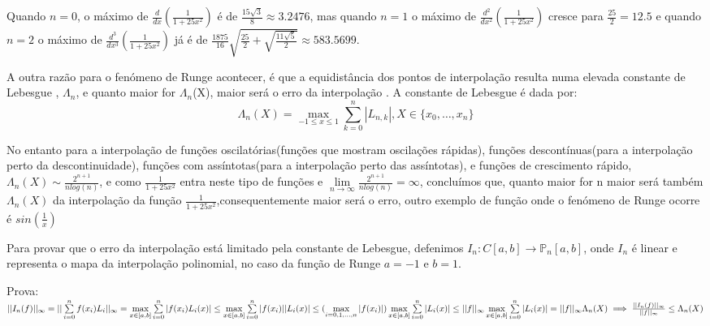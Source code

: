 \documentclass[12pt]{article}
\begin{document}
\hspace{0.5cm}Quando $n=0$, o máximo de $\frac{d}{dx}(\frac{1}{1+25x^2})$ é de $\frac{15\sqrt{3}}{8} \approx 3.2476$, mas quando $n=1$ o máximo de $\frac{d^2}{dx^2}(\frac{1}{1+25x^2})$ cresce para $\frac{25}{2}=12.5$ e quando $n=2$ o máximo de $\frac{d^3}{dx^3}(\frac{1}{1+25x^2})$ já é de $\frac{1875}{16}\sqrt{\frac{25}{2}+\sqrt{\frac{11\sqrt{5}}{2}}} \approx 583.5699$.



\hspace{0.5cm}A outra razão para o fenómeno de Runge acontecer, é que a equidistância dos pontos de interpolação resulta numa elevada constante de Lebesgue \cite{wikipedia3}, $\Lambda_n$, e quanto maior for $\Lambda_n$(X), maior será o erro da interpolação . A constante de Lebesgue é dada por: \[\Lambda_n(X)=\max_{-1\leq x\leq 1}\sum\limits_{k=0}^{n}|L_{n,k}|, X \in \{x_0,\ldots,x_n\}\]

\hspace{0.5cm}No entanto para a interpolação de funções oscilatórias(funções que mostram oscilações rápidas), funções descontínuas(para a interpolação perto da descontinuidade), funções com assíntotas(para a interpolação perto das assíntotas), e funções de crescimento rápido,
$\Lambda_n(X)\sim\frac{2^{n+1}}{nlog(n)}$, e como $\frac{1}{1+25x^2}$ entra neste tipo de funções e $\lim\limits_{n\to\infty}{\frac{2^{n+1}}{nlog(n)}}=\infty$, concluímos que, quanto maior for n maior será também $\Lambda_n(X)$ da interpolação da função $\frac{1}{1+25x^2}$,consequentemente maior será o erro, outro exemplo de função onde o fenómeno de Runge ocorre é $sin(\frac{1}{x})$

\hspace{0.5cm}Para provar que o erro da interpolação está limitado pela constante de Lebesgue\cite{Video}, defenimos $I_n: C[a,b] \rightarrow \mathbb{P}_n[a,b]$, onde $I_n$ é linear e representa o mapa da interpolação polinomial, no caso da função de Runge $a=-1$ e $b=1$.

\hspace{0.5cm}Prova:\\
$||I_n(f)||_\infty = ||\sum\limits_{i=0}^nf(x_i)L_i||_\infty = \max\limits_{x \in [a,b]}\sum\limits_{i=0}^{n}|f(x_i)L_i(x)| \leq \max\limits_{x \in [a,b]}\sum\limits_{i=0}^{n}|f(x_i)||L_i(x)|\vspace{0.1cm} \leq (\max\limits_{i = 0,1, \dots, n}|f(x_i)|)\max\limits_{x \in [a,b]}\sum\limits_{i=0}^{n}|L_i(x)| \leq ||f||_\infty\max\limits_{x \in [a,b]}\sum\limits_{i=0}^{n}|L_i(x)| = ||f||_\infty\Lambda_n(X)\vspace{0.3cm}\\ \implies \frac{||I_n(f)||_\infty}{||f||_\infty} \leq \Lambda_n(X)$
\end{document}
